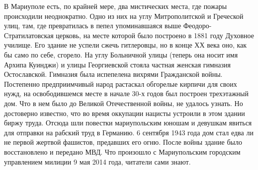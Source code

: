 
В Мариуполе есть, по крайней мере, два мистических места, где пожары
происходили неоднократно. Одно из них на углу Митрополитской и Греческой улиц,
там, где превратилась в пепел упоминавшаяся выше Феодоро-Стратилатовская
церковь, на месте которой было построено в 1881 году Духовное училище. Его
здание не успели сжечь гитлеровцы, но в конце ХХ века оно, как бы само по себе,
сгорело. На углу Больничной улицы (теперь она носит имя Архипа Куинджи) и улицы
Георгиевской стояла частная женская гимназия Остославской. Гимназия была
испепелена  вихрями Гражданской войны. Постепенно предприимчивый народ
растаскал обгорелые кирпичи для своих нужд, на освободившемся месте в начале
30-х годов был построен трехэтажный дом. Что в нем было до Великой
Отечественной войны, не удалось узнать. Но достоверно известно, что во время
оккупации нацисты устроили в этом здании биржу труда. Отсюда шли повестки
мариупольским юношам и девушкам явиться для отправки на рабский труд в
Германию. 6 сентября 1943 года дом стал едва ли не первой жертвой фашистов,
предавших его огню. После войны здание было восстановлено и передано МВД. Что
произошло с Мариупольским  городским управлением милиции 9 мая 2014 года,
читатели сами знают. 
